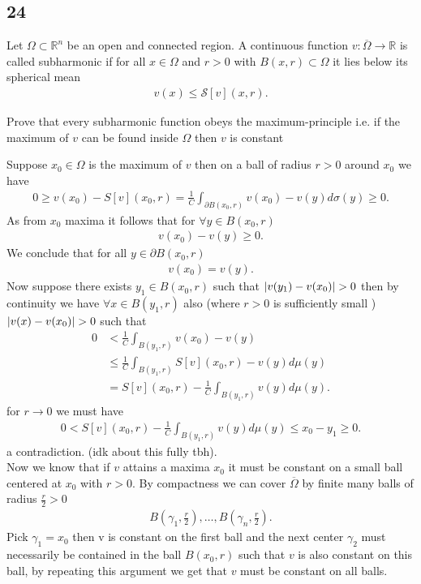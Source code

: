 \subsection*{24}
Let $\Omega \subset  \mathbb{R}^{n} $ be an open and connected region. A continuous function $v : \overline{\Omega } \to \mathbb{R} $
is called subharmonic if for all $x \in  \Omega $ and $r>0$ with $B(x,r) \subset  \Omega $ it lies below its spherical mean 
\begin{align*}
  v(x) \le  \mathcal{S}[v](x,r)
.\end{align*}
\begin{question}[a]
 Prove that every subharmonic function obeys the maximum-principle i.e. 
 if the maximum of $v$ can be found inside $\Omega $ then $v$ is constant
\end{question}
\begin{solution}
 Suppose $x_{0} \in  \Omega $ is the maximum of $v$ then on a ball of radius $r>0$ around $x_{0}$ we have
 \begin{align*}
   0 \ge  v(x_{0}) - S[v](x_{0},r) = \frac{1}{C} \int_{\partial B(x_{0},r)} v(x_{0}) - v(y) d\sigma(y) \ge  0
 .\end{align*}
 As from $x_{0}$ maxima it follows that  for $\forall  y \in  B(x_{0},r)$ 
 \begin{align*}
  v(x_{0}) - v(y) \ge 0
 .\end{align*}
 We conclude that for all $y \in  \partial B(x_{0},r)$ 
 \begin{align*}
  v(x_{0}) = v(y)
 .\end{align*}
 Now suppose there exists $y_{1} \in B(x_{0},r)  $ such that $\lvert v(y_{1})-v(x_{0})\rvert > 0$ then by continuity we have 
 $\forall  x \in  B(y_{1},r)$ also (where $r>0$ is sufficiently small )$\lvert v(x)-v(x_{0})\rvert > 0$ such that 
 \begin{align*}
   0 &< \frac{1}{C} \int_{B(y_{1},r)} v(x_{0}) - v(y) \\
     &\le \frac{1}{C} \int_{B(y_{1},r)} S[v](x_{0},r) - v(y) d\mu(y)\\ &
     = S[v](x_{0},r) - \frac{1}{C} \int_{B(y_{1},r)} v(y) d\mu(y)  
 .\end{align*}
 for $r \to 0$ we must have 
 \begin{align*}
   0 < S[v](x_{0},r) - \frac{1}{C} \int_{B(y_{1},r)} v(y) d\mu(y) \le x_{0}-y_{1} \ge  0
 .\end{align*}
 a contradiction.  (idk about this fully tbh). \\[1ex]
 Now we know that if $v$ attains a maxima $x_{0}$ it must be constant on a small ball centered at $x_{0}$ with $r>0$. 
 By compactness we can cover $\overline{\Omega }$  by finite many balls of radius $\frac{r}{2}>0$ 
 \begin{align*}
  B(\gamma_{1},\frac{r}{2}),\ldots ,B(\gamma_n,\frac{r}{2})
 .\end{align*}
 Pick $\gamma_{1} = x_{0}$ then v is constant on the first ball and the next center $\gamma_{2}$ must necessarily be contained in the ball 
 $B(x_{0},r)$ such that $v$ is also constant on this ball, by repeating this argument we get that $v$ must be constant on all balls.
\end{solution}
